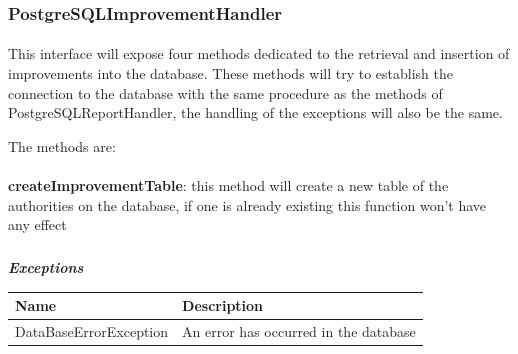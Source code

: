 				\subsubsection{PostgreSQLImprovementHandler}
					\paragraph{}
						This interface will expose four methods dedicated to the retrieval and insertion of improvements into the database. These methods will try to establish the connection to the database with the same procedure as the methods of PostgreSQLReportHandler, the handling of the exceptions will also be the same.
						
						The methods are:
							\paragraph{}
							\textbf{createImprovementTable}: this method will create a new table of the authorities on the database, if one is already existing this function won't have any effect
							\subparagraph{}
							\vspace{-3mm}
								\textit{\textbf{Exceptions}}
								\vspace{-2mm}
									\begin{table}[!h]
									\begin{tabular}{ll}
										\toprule
										\textbf{Name} & \textbf{Description} \\
										\midrule
								  		DataBaseErrorException & An error has occurred in the database \\ 
								 		\bottomrule
									\end{tabular}
								\end{table}
								
